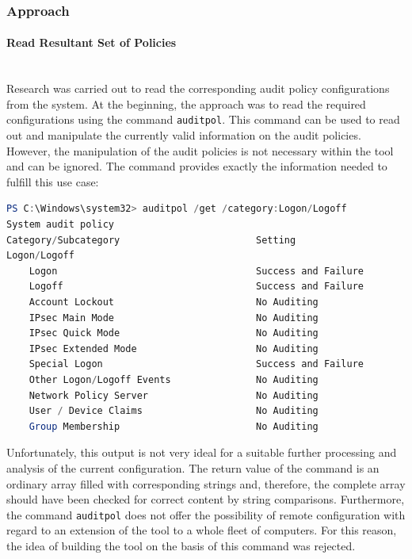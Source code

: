 \subsubsection{Approach}
\paragraph{Read Resultant Set of Policies} \ \\
Research was carried out to read the corresponding audit policy configurations from the system. At the beginning, the approach was to read the required configurations using the command \lstinline|auditpol|. \cite{auditpol} This command can be used to read out and manipulate the currently valid information on the audit policies. However, the manipulation of the audit policies is not necessary within the tool and can be ignored. The command provides exactly the information needed to fulfill this use case:
\begin{lstlisting}[caption=auditpol, language=PowerShell]
PS C:\Windows\system32> auditpol /get /category:Logon/Logoff
System audit policy
Category/Subcategory                        Setting
Logon/Logoff
    Logon                                   Success and Failure
    Logoff                                  Success and Failure
    Account Lockout                         No Auditing
    IPsec Main Mode                         No Auditing
    IPsec Quick Mode                        No Auditing
    IPsec Extended Mode                     No Auditing
    Special Logon                           Success and Failure
    Other Logon/Logoff Events               No Auditing
    Network Policy Server                   No Auditing
    User / Device Claims                    No Auditing
    Group Membership                        No Auditing
\end{lstlisting}
Unfortunately, this output is not very ideal for a suitable further processing and analysis of the current configuration. The return value of the command is an ordinary array filled with corresponding strings and, therefore, the complete array should have been checked for correct content by string comparisons. Furthermore, the command \lstinline|auditpol| does not offer the possibility of remote configuration with regard to an extension of the tool to a whole fleet of computers. For this reason, the idea of building the tool on the basis of this command was rejected.
\\\\

